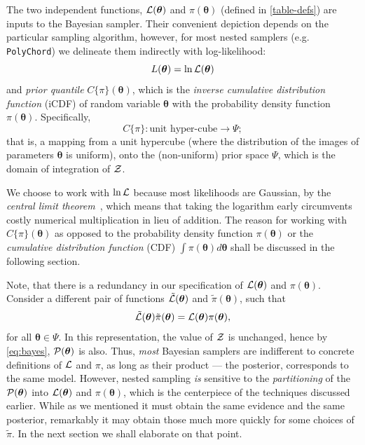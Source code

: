 \documentclass[usenatbib]{mnras}
\begin{document}
The two independent functions, \({\cal L}(\bm{\theta})\) and
\(\pi(\bm{\theta})\) (defined in \cref{table-defs}) are inputs to the
Bayesian sampler. Their convenient depiction depends on the
particular sampling algorithm, however, for most nested samplers
(e.g. \texttt{PolyChord}) we delineate them indirectly with log-likelihood:
\begin{equation*}
  L(\bm{\theta}) = \ln \cal L (\bm{\theta})
\end{equation*}
and \emph{prior quantile} \(C\{\pi\}(\bm{\theta})\), which is the
\emph{inverse cumulative distribution function} (iCDF) of random
variable \(\bm{\theta}\) with the probability density function
\(\pi(\bm{\theta})\). Specifically,
\begin{equation*}
 C\{\pi\} : \text{unit hyper-cube} \rightarrow \Psi;
\end{equation*}
that is, a mapping from a unit hypercube (where the distribution of
the images of parameters \(\bm{\theta}\) is uniform), onto the
(non-uniform) prior space \(\Psi\), which is the domain of
integration of \({\cal Z}\).

We choose to work with \(\ln {\cal L}\) because most likelihoods are
Gaussian, by the \emph{central limit theorem}~\citep{central-limit-theorem}, which
means that taking the logarithm early circumvents costly numerical
multiplication in lieu of addition. The reason for working with
\(C\{\pi\}(\bm{\theta})\) as opposed to the probability density
function \(\pi(\bm{\theta})\) or the \emph{cumulative distribution
  function} (CDF) \(\int \pi(\bm{\theta}) d\bm{\theta}\) shall be
discussed in the following section.

Note, that there is a redundancy in our specification of \({\cal
   L}(\bm{\theta})\) and \(\pi(\bm{\theta})\).  Consider a
different pair of functions \(\tilde{{\cal L}}(\bm{\theta})\) and
\(\tilde{\pi}(\bm{\theta})\), such that
\begin{equation}\label{eq:redundancy}
  \tilde{\cal L}(\bm{\theta}) \tilde{\pi}(\bm{\theta}) = \cal L (\bm{\theta}) \pi (\bm{\theta}), 
\end{equation}
for all \(\bm{\theta} \in \Psi\). In this representation, the
value of \({\cal Z}\) is unchanged, hence by \cref{eq:bayes},
\({\cal P}(\bm{\theta})\) is also. Thus, \emph{most} Bayesian samplers
are indifferent to concrete definitions of \(\cal L\) and \(\pi\),
as long as their product --- the posterior, corresponds to the same
model. However, nested sampling \emph{is} sensitive to the
\emph{partitioning} of the \({\cal P} (\bm{\theta})\) into \({\cal L}(\bm{\theta})\)
and \(\pi(\bm{\theta})\), which is the centerpiece of the techniques
discussed earlier. While as we mentioned it must obtain the same
evidence and the same posterior, remarkably it may obtain those
much more quickly for some choices of \(\tilde{\pi}\). In the next
section we shall elaborate on that point.
\end{document}
